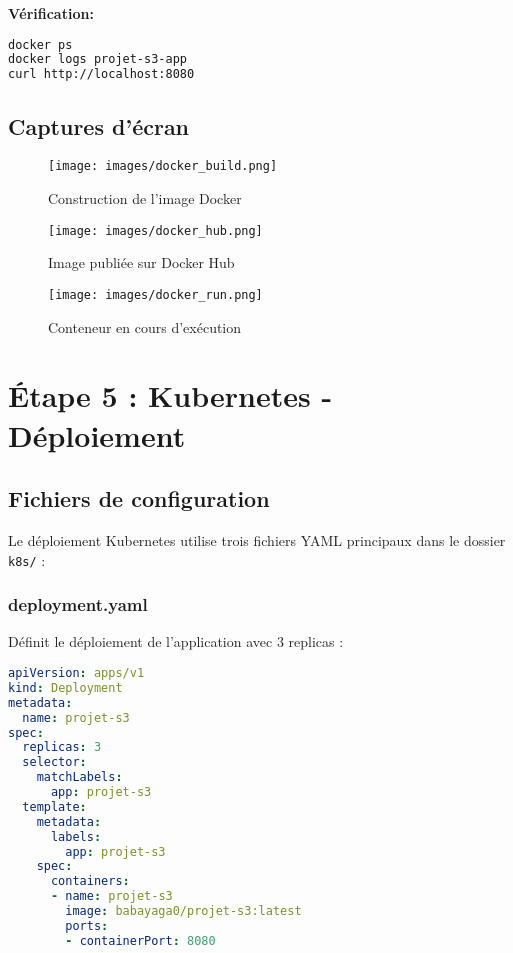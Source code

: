 \documentclass[12pt,a4paper]{article}
\begin{document}
\textbf{Vérification:}
\begin{lstlisting}[language=bash]
docker ps
docker logs projet-s3-app
curl http://localhost:8080
\end{lstlisting}

\subsection{Captures d'écran}

\begin{figure}[H]
    \centering
    \texttt{[image: images/docker\_build.png]}
    \caption{Construction de l'image Docker}
    \label{fig:docker_build}
\end{figure}

\begin{figure}[H]
    \centering
    \texttt{[image: images/docker\_hub.png]}
    \caption{Image publiée sur Docker Hub}
    \label{fig:docker_hub}
\end{figure}

\begin{figure}[H]
    \centering
    \texttt{[image: images/docker\_run.png]}
    \caption{Conteneur en cours d'exécution}
    \label{fig:docker_run}
\end{figure}

\newpage

\section{Étape 5 : Kubernetes - Déploiement}

\subsection{Fichiers de configuration}

Le déploiement Kubernetes utilise trois fichiers YAML principaux dans le dossier \texttt{k8s/} :

\subsubsection{deployment.yaml}
Définit le déploiement de l'application avec 3 replicas :
\begin{lstlisting}[language=yaml]
apiVersion: apps/v1
kind: Deployment
metadata:
  name: projet-s3
spec:
  replicas: 3
  selector:
    matchLabels:
      app: projet-s3
  template:
    metadata:
      labels:
        app: projet-s3
    spec:
      containers:
      - name: projet-s3
        image: babayaga0/projet-s3:latest
        ports:
        - containerPort: 8080
\end{lstlisting}
\end{document}
